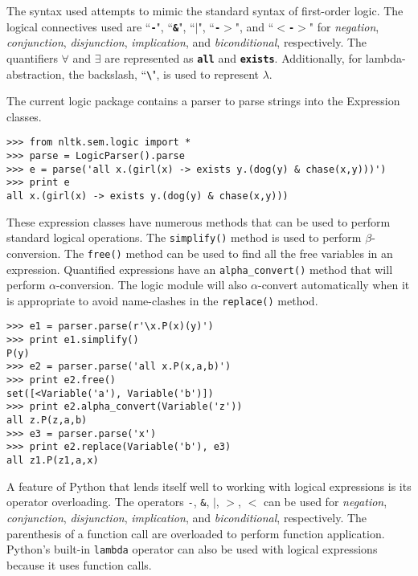 \documentclass[11pt]{article}
\newcommand{\dhgcode}[1]{{\tt #1}}
\begin{document}
\enumsentence{\label{logic1}\dhgcode{all x.(girl(x) -$>$ exists y.(dog(x) \& chase(x,y)))}}

The syntax used attempts to mimic the standard syntax of first-order logic.  The logical connectives used are ``\textbf{\dhgcode{-}}", ``\textbf{\dhgcode{\&}}", ``\textbf{\dhgcode{$|$}}", ``\textbf{\dhgcode{-$>$}}", and ``\textbf{\dhgcode{$<$-$>$}}" for \emph{negation}, \emph{conjunction}, \emph{disjunction}, \emph{implication}, and \emph{biconditional}, respectively.  The quantifiers $\forall$ and $\exists$ are represented as \textbf{\dhgcode{all}} and \textbf{\dhgcode{exists}}.  Additionally, for lambda-abstraction, the backslash, ``\textbf{\dhgcode{\textbackslash}}", is used to represent \textbf{\emph{$\lambda$}}.

The current logic package contains a parser to parse strings into the Expression classes.

\begin{verbatim}
>>> from nltk.sem.logic import *
>>> parse = LogicParser().parse
>>> e = parse('all x.(girl(x) -> exists y.(dog(y) & chase(x,y)))')
>>> print e
all x.(girl(x) -> exists y.(dog(y) & chase(x,y)))
\end{verbatim}

These expression classes have numerous methods that can be used to perform standard logical operations.  The \dhgcode{simplify()} method is used to perform $\beta$-conversion.  The \dhgcode{free()} method can be used to find all the free variables in an expression.  Quantified expressions have an \dhgcode{alpha\_convert()} method that will perform $\alpha$-conversion.  The logic module will also $\alpha$-convert automatically when it is appropriate to avoid name-clashes in the \dhgcode{replace()} method.

\begin{verbatim}
>>> e1 = parser.parse(r'\x.P(x)(y)')
>>> print e1.simplify()
P(y)
>>> e2 = parser.parse('all x.P(x,a,b)')
>>> print e2.free()
set([<Variable('a'), Variable('b')])
>>> print e2.alpha_convert(Variable('z'))
all z.P(z,a,b)
>>> e3 = parser.parse('x')
>>> print e2.replace(Variable('b'), e3)
all z1.P(z1,a,x)
\end{verbatim}

A feature of Python that lends itself well to working with logical expressions is its operator overloading.  The operators \dhgcode{-}, \dhgcode{\&}, \dhgcode{$|$}, \dhgcode{$>$}, \dhgcode{$<$} can be used for \emph{negation}, \emph{conjunction}, \emph{disjunction}, \emph{implication}, and \emph{biconditional}, respectively.  The parenthesis of a function call are overloaded to perform function application.  Python's built-in \dhgcode{lambda} operator can also be used with logical expressions because it uses function calls.
\end{document}
